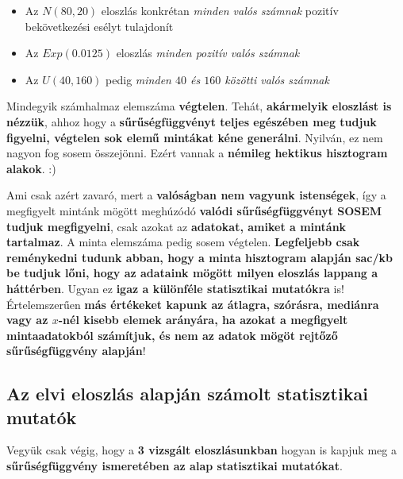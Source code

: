 \documentclass[
]{book}
\providecommand{\tightlist}{%
  \setlength{\itemsep}{0pt}\setlength{\parskip}{0pt}}
\begin{document}
\begin{itemize}
\tightlist
\item
  Az \(N(80,20)\) eloszlás konkrétan \emph{minden valós számnak} pozitív bekövetkezési esélyt tulajdonít
\item
  Az \(Exp(0.0125)\) eloszlás \emph{minden pozitív valós számnak}
\item
  Az \(U(40,160)\) pedig \emph{minden \(40\) és \(160\) közötti valós számnak}
\end{itemize}

Mindegyik számhalmaz elemszáma \textbf{végtelen}. Tehát, \textbf{akármelyik eloszlást is nézzük}, ahhoz hogy a \textbf{sűrűségfüggvényt teljes egészében meg tudjuk figyelni, végtelen sok elemű mintákat kéne generálni}. Nyilván, ez nem nagyon fog sosem összejönni. Ezért vannak a \textbf{némileg hektikus hisztogram alakok}. :)

Ami csak azért zavaró, mert a \textbf{valóságban nem vagyunk istenségek}, így a megfigyelt mintánk mögött meghúzódó \textbf{valódi sűrűségfüggvényt SOSEM tudjuk megfigyelni}, csak azokat az \textbf{adatokat, amiket a mintánk tartalmaz}. A minta elemszáma pedig sosem végtelen. \textbf{Legfeljebb csak reménykedni tudunk abban, hogy a minta hisztogram alapján sac/kb be tudjuk lőni, hogy az adataink mögött milyen eloszlás lappang a háttérben}.
Ugyan ez \textbf{igaz a különféle statisztikai mutatókra} is! Értelemszerűen \textbf{más értékeket kapunk az átlagra, szórásra, mediánra vagy az \(x\)-nél kisebb elemek arányára, ha azokat a megfigyelt mintaadatokból számítjuk, és nem az adatok mögöt rejtőző sűrűségfüggvény alapján}!

\subsection{Az elvi eloszlás alapján számolt statisztikai mutatók}\label{az-elvi-eloszluxe1s-alapjuxe1n-szuxe1molt-statisztikai-mutatuxf3k}

Vegyük csak végig, hogy a \textbf{3 vizsgált eloszlásunkban} hogyan is kapjuk meg a \textbf{sűrűségfüggvény ismeretében az alap statisztikai mutatókat}.
\end{document}
